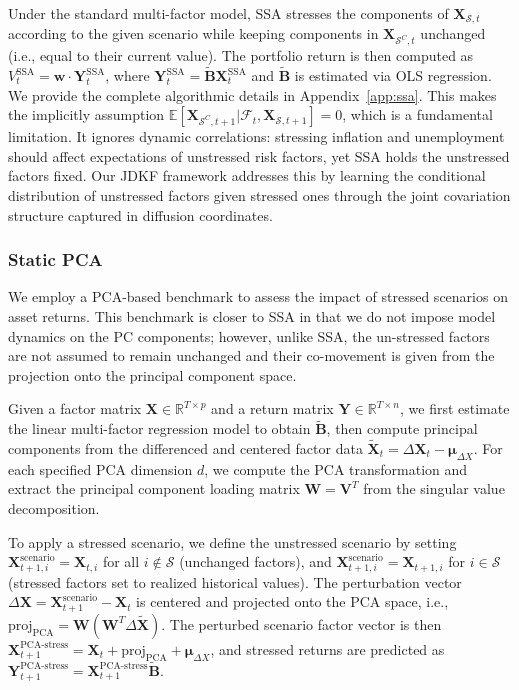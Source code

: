 \documentclass[11pt]{article}
\theoremstyle{plain}
\theoremstyle{definition}
\theoremstyle{remark}
\numberwithin{equation}{section}
\begin{document}
Under the standard multi-factor model, SSA stresses the components of $\mathbf{X}_{\mathcal{S},t}$ according to the given scenario while keeping components in $\mathbf{X}_{\mathcal{S}^C,t}$ unchanged (i.e., equal to their current value). The portfolio return is then computed as $V_t^{\text{SSA}} = \mathbf{w} \cdot \mathbf{Y}_t^{\text{SSA}}$, where $\mathbf{Y}_t^{\text{SSA}} = \tilde{\mathbf{B}}\mathbf{X}_t^{\text{SSA}}$ and $\tilde{\mathbf{B}}$ is estimated via OLS regression. We provide the complete algorithmic details  in Appendix~\ref{app:ssa}.  {This makes the implicitly assumption $\mathbb{E}[\mathbf{X}_{\mathcal{S}^C,t+1}|\mathcal{F}_t, \mathbf{X}_{\mathcal{S},t+1}] = 0$, which is a fundamental limitation. It ignores dynamic correlations: stressing inflation and unemployment should affect 
expectations of unstressed risk factors, yet SSA holds the unstressed factors fixed. Our JDKF framework addresses 
this by learning the conditional distribution of unstressed factors given stressed ones through the joint covariation structure captured in diffusion coordinates.}

\subsubsection{Static PCA}

We employ a PCA-based benchmark to assess the impact of stressed scenarios on asset returns. This benchmark is closer to SSA in that we do not impose model dynamics on the PC components; however, unlike SSA, the un-stressed factors are not assumed to remain unchanged and their co-movement is given from the projection onto the principal component space.

Given a factor matrix $\mathbf{X} \in \mathbb{R}^{T \times p}$ and a return matrix $\mathbf{Y} \in \mathbb{R}^{T \times n}$, we first estimate the linear multi-factor regression model to obtain $\tilde{\mathbf{B}}$, then compute principal components from the differenced and centered factor data $\tilde{\mathbf{X}}_t = \Delta \mathbf{X}_t - \boldsymbol{\mu}_{\Delta X}$. For each specified PCA dimension $d$, we compute the PCA transformation and extract the principal component loading matrix $\mathbf{W} = \mathbf{V}^T$ from the singular value decomposition.

To apply a stressed scenario, we define the unstressed scenario by setting $\mathbf{X}^{\text{scenario}}_{t+1,i} = \mathbf{X}_{t,i}$ for all $i \notin \mathcal{S}$ (unchanged factors), and $\mathbf{X}^{\text{scenario}}_{t+1,i} = \mathbf{X}_{t+1,i}$ for $i \in \mathcal{S}$ (stressed factors set to realized historical values). The perturbation vector $\Delta \mathbf{X} = \mathbf{X}^{\text{scenario}}_{t+1} - \mathbf{X}_t$ is centered and projected onto the PCA space, i.e., $\text{proj}_{\text{PCA}} = \mathbf{W}(\mathbf{W}^T \Delta \tilde{\mathbf{X}})$. The perturbed scenario factor vector is then $\mathbf{X}^{\text{PCA-stress}}_{t+1} = \mathbf{X}_t + \text{proj}_{\text{PCA}} + \boldsymbol{\mu}_{\Delta X}$, and stressed returns are predicted as $\mathbf{Y}^{\text{PCA-stress}}_{t+1} = \mathbf{X}^{\text{PCA-stress}}_{t+1} \tilde{\mathbf{B}}$.
\end{document}
